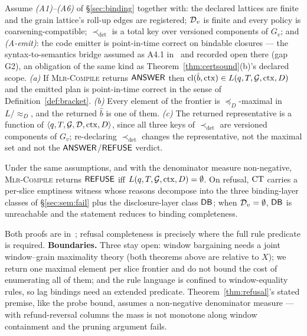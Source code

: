\begin{theorem}
\label{thm:sound}\label{thm:maximal}
 Assume \emph{(A1)--(A6)} of \S\ref{sec:binding} together with: the declared
lattices are finite and the grain lattice's roll-up edges are registered;
$\mathcal{D}_v$ is finite and every policy is coarsening-compatible;
$\prec_{\det}$ is a total key over versioned components of $G_v$; and
\emph{(A-emit)}: the code emitter is point-in-time correct on bindable
closures --- the syntax-to-semantics bridge assumed as A4.1 in~\cite{asofgov-tr}
and recorded open there (gap G2), an obligation of the same kind as
Theorem~\ref{thm:certsound}(b)'s declared scope.
\emph{(a)} If \textsc{Mlr-Compile} returns $\mathsf{ANSWER}$ then
$\mathrm{cl}(\hat b,\mathrm{ctx})\in L(q,T,\mathcal{G},\mathrm{ctx},D)$ and the emitted plan is
point-in-time correct in the sense of Definition~\ref{def:bracket}.
\emph{(b)} Every element of the frontier is $\preceq_D$-maximal in
$L/\!\approx_D$, and the returned $\hat b$ is one of them.
\emph{(c)} The returned representative is a function of
$\langle q,T,\mathcal{G},\mathcal{D},\mathrm{ctx},D\rangle$, since all three keys of
$\prec_{\det}$ are versioned components of $G_v$; re-declaring $\prec_{\det}$
changes the representative, not the maximal set and not the $\mathsf{ANSWER}$/$\mathsf{REFUSE}$
verdict.
\end{theorem}

\begin{theorem}
\label{thm:refusal}
 Under the same assumptions, and with the denominator measure non-negative,
\textsc{Mlr-Compile} returns $\mathsf{REFUSE}$ iff $L(q,T,\mathcal{G},\mathrm{ctx},D)=\emptyset$. On
refusal, $\mathrm{CT}$ carries a per-slice emptiness witness whose reasons decompose
into the three binding-layer classes of \S\ref{sec:sem:fail} plus the
disclosure-layer class $\mathsf{DB}$; when $\mathcal{D}_v=\emptyset$, $\mathsf{DB}$ is unreachable
and the statement reduces to binding completeness.
\end{theorem}

\noindent{} Both proofs are in~\cite{asofgov-tr}; refusal completeness is
precisely where the full rule predicate is required.
\textbf{Boundaries.} Three stay open: window bargaining needs
a joint window--grain maximality theory (both theorems above are relative to
$X$); we return one maximal element per slice
frontier and do not bound the cost of enumerating all of them; and the rule
language is confined to window-equality rules, so lag bindings need an extended
predicate. Theorem~\ref{thm:refusal}'s stated premise, like the probe
bound, assumes a non-negative denominator measure --- with
refund-reversal columns the mass is not monotone along window containment and
the pruning argument fails.
